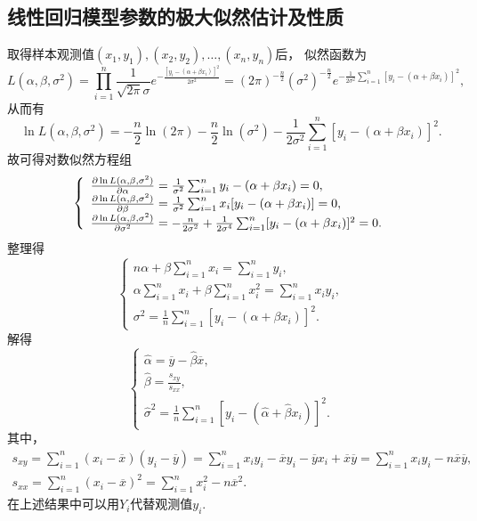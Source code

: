 \subsection{线性回归模型参数的极大似然估计及性质}
取得样本观测值\((x_1,y_1),(x_2,y_2),\dotsc,(x_n,y_n)\)后，
似然函数为\begin{equation*}
	L(\alpha,\beta,\sigma^2)
	= \prod_{i=1}^n{ \frac{1}{\sqrt{2\pi}\sigma} e^{ -\frac{[y_i - (\alpha+\beta x_i)]^2}{2\sigma^2} } }
	= (2\pi)^{-\frac{n}{2}} (\sigma^2)^{-\frac{n}{2}} e^{ -\frac{1}{2\sigma^2} \sum_{i=1}^n[y_i - (\alpha+\beta x_i)]^2 },
\end{equation*}
从而有\begin{equation*}
	\ln L(\alpha,\beta,\sigma^2)
	= -\frac{n}{2} \ln(2\pi) - \frac{n}{2} \ln(\sigma^2) - \frac{1}{2\sigma^2} \sum_{i=1}^n[y_i-(\alpha+\beta x_i)]^2.
\end{equation*}
故可得对数似然方程组\begin{equation*}
	\left\{ \begin{array}{l}
		\pdv{\ln L(\alpha,\beta,\sigma^2)}{\alpha}
		= \frac{1}{\sigma^2} \sum_{i=1}^n{y_i-(\alpha+\beta x_i)} = 0, \\
		\pdv{\ln L(\alpha,\beta,\sigma^2)}{\beta}
		= \frac{1}{\sigma^2} \sum_{i=1}^n{x_i[y_i-(\alpha+\beta x_i)]} = 0, \\
		\pdv{\ln L(\alpha,\beta,\sigma^2)}{\sigma^2}
		= -\frac{n}{2\sigma^2} + \frac{1}{2\sigma^4} \sum_{i=1}^n[y_i-(\alpha+\beta x_i)]^2 = 0.
	\end{array} \right.
\end{equation*}
整理得\begin{equation*}
	\left\{ \begin{array}{l}
		n \alpha + \beta \sum_{i=1}^n{x_i} = \sum_{i=1}^n{y_i}, \\
		\alpha \sum_{i=1}^n{x_i} + \beta \sum_{i=1}^n{x_i^2} = \sum_{i=1}^n{x_i y_i}, \\
		\sigma^2 = \frac{1}{n} \sum_{i=1}^n[y_i - (\alpha+\beta x_i)]^2.
	\end{array} \right.
\end{equation*}
解得\begin{equation*}
	\left\{ \begin{array}{l}
		\hat{\alpha} = \overline{y} - \hat{\beta} \overline{x}, \\
		\hat{\beta} = \frac{s_{xy}}{s_{xx}}, \\
		\hat{\sigma}^2 = \frac{1}{n} \sum_{i=1}^n[y_i - (\hat{\alpha}+\hat{\beta}x_i)]^2.
	\end{array} \right.
\end{equation*}
其中，\begin{gather*}
	s_{xy} = \sum_{i=1}^n(x_i-\overline{x})(y_i-\overline{y})
	= \sum_{i=1}^n{x_i y_i - \overline{x}y_i - \overline{y}x_i + \overline{x}\overline{y}}
	= \sum_{i=1}^n{x_i y_i - n \overline{x} \overline{y}}, \\
	s_{xx} = \sum_{i=1}^n(x_i - \overline{x})^2
	= \sum_{i=1}^n{x_i^2 - n \overline{x}^2}.
\end{gather*}
在上述结果中可以用\(Y_i\)代替观测值\(y_i\).

